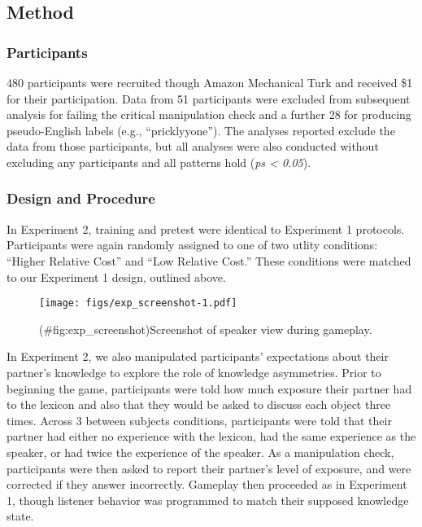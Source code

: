\documentclass[english,,man,floatsintext]{apa6}
\begin{document}
\hypertarget{method-1}{%
\subsection{Method}\label{method-1}}

\hypertarget{participants-2}{%
\subsubsection{Participants}\label{participants-2}}

480 participants were recruited though Amazon Mechanical Turk and received \$1 for their participation. Data from 51 participants were excluded from subsequent analysis for failing the critical manipulation check and a further 28 for producing pseudo-English labels (e.g., \enquote{pricklyyone}). The analyses reported exclude the data from those participants, but all analyses were also conducted without excluding any participants and all patterns hold (\emph{ps \textless{} 0.05}).

\hypertarget{design-and-procedure-1}{%
\subsubsection{Design and Procedure}\label{design-and-procedure-1}}

In Experiment 2, training and pretest were identical to Experiment 1 protocols. Participants were again randomly assigned to one of two utlity conditions: \enquote{Higher Relative Cost} and \enquote{Low Relative Cost.} These conditions were matched to our Experiment 1 design, outlined above.

\begin{figure}
\centering
\texttt{[image: figs/exp\_screenshot-1.pdf]}
\caption{(\#fig:exp\_screenshot)Screenshot of speaker view during gameplay.}
\end{figure}

In Experiment 2, we also manipulated participants' expectations about their partner's knowledge to explore the role of knowledge asymmetries. Prior to beginning the game, participants were told how much exposure their partner had to the lexicon and also that they would be asked to discuss each object three times. Across 3 between subjects conditions, participants were told that their partner had either no experience with the lexicon, had the same experience as the speaker, or had twice the experience of the speaker. As a manipulation check, participants were then asked to report their partner's level of exposure, and were corrected if they answer incorrectly. Gameplay then proceeded as in Experiment 1, though listener behavior was programmed to match their supposed knowledge state.
\end{document}
